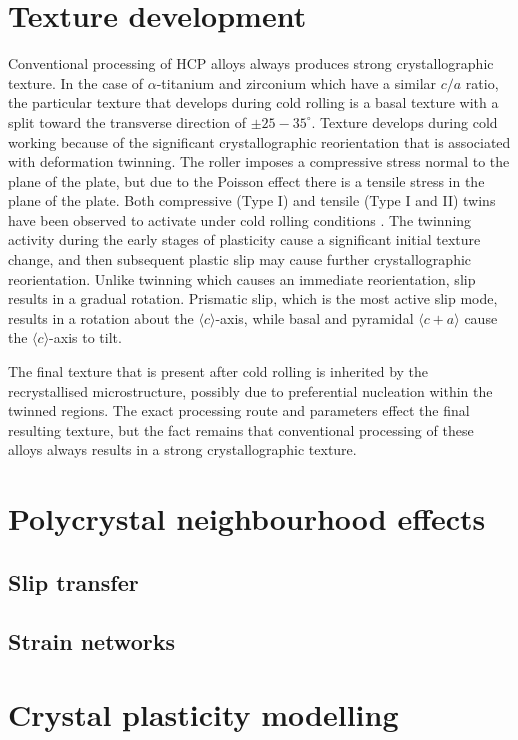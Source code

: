 \section{Texture development}
Conventional processing of HCP alloys always produces strong crystallographic texture.
In the case of $\alpha$-titanium and zirconium which have a similar $c/a$ ratio, the particular texture that develops during cold rolling is a basal texture with a split toward the transverse direction of $\pm 25-35^\circ$.
Texture develops during cold working because of the significant crystallographic reorientation that is associated with deformation twinning.
The roller imposes a compressive stress normal to the plane of the plate, but due to the Poisson effect there is a tensile stress in the plane of the plate.
Both compressive (Type I) and tensile (Type I and II) twins have been observed to activate under cold rolling conditions \cite{bozzoloMisorientationsInducedDeformation2010}.
The twinning activity during the early stages of plasticity cause a significant initial texture change, and then subsequent plastic slip may cause further crystallographic reorientation.
Unlike twinning which causes an immediate reorientation, slip results in a gradual rotation.
Prismatic slip, which is the most active slip mode, results in a rotation about the $\langle c \rangle$-axis, while basal and pyramidal $\langle c + a \rangle$ cause the $\langle c \rangle$-axis to tilt.

The final texture that is present after cold rolling is inherited by the recrystallised microstructure, possibly due to preferential nucleation within the twinned regions.
The exact processing route and parameters effect the final resulting texture, but the fact remains that conventional processing of these alloys always results in a strong crystallographic texture.


\section{Polycrystal neighbourhood effects}
\subsection{Slip transfer}
\subsection{Strain networks}

\section{Crystal plasticity modelling}